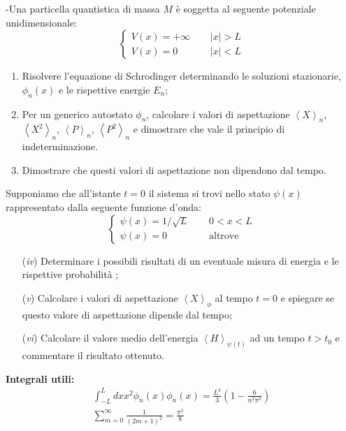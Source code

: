 \documentclass[12pt,twoside,a4]{article}
\begin{document}
\begin{esercizio}
	-Una particella quantistica di massa $M$ è soggetta al seguente potenziale unidimensionale:
	\begin{equation*}
		\begin{cases}
			V(x)= + \infty \hspace{15pt} &|x|>L\\
			V(x)= 0 &|x|<L
		\end{cases}
	\end{equation*}
	\begin{enumerate}[label=(\textit{\roman*})]
		\item Risolvere l'equazione di Schrodinger determinando le soluzioni stazionarie, $\phi_n(x)$ e le rispettive energie $E_n$;
		\item Per un generico autostato $\phi_n$, calcolare i valori di aspettazione $\left< X \right>_n$, $\left< X ^2 \right>_n$, $\left< P \right>_n$, $\left< P^2 \right>_n$ e dimostrare che vale il principio di indeterminazione.
		\item Dimostrare che questi valori di aspettazione non dipendono dal tempo.
	\end{enumerate}
	Supponiamo che all'istante $t=0$ il sistema si trovi nello stato $\psi(x)$ rappresentato dalla seguente funzione d'onda:
	\begin{equation*}
		\begin{cases}
			\psi(x) = 1/ \sqrt{L} \hspace{15pt} &0<x<L\\
			\psi(x)=0 &\text{altrove}
		\end{cases}
	\end{equation*}
	\begin{enumerate}[label=(\textit{\roman*})]
	\item[(\textit{iv})] Determinare i possibili risultati di un eventuale misura di energia e le rispettive probabilità ;
	\item[(\textit{v})] Calcolare i valori di aspettazione $\left< X \right>_{\phi}$ al tempo $t=0$ e spiegare se questo valore di aspettazione dipende dal tempo;
	\item[(\textit{vi})] Calcolare il valore medio dell'energia $\left< H \right>_{\psi(t)}$ ad un tempo $t>t_0$ e commentare il risultato ottenuto.
	\end{enumerate}
	\textbf{Integrali utili:}
	\begin{gather}
	\int_{-L}^L dx x^2 \phi_n(x) \phi_n(x)= \frac{L^3}{3}\left( 1- \frac{6}{n^2\pi^2} \right)\\
	\sum_{m=0}^\infty \frac{1}{(2m +1)^2}= \frac{\pi^2}{8}	
	\end{gather}
\end{esercizio}
\end{document}
